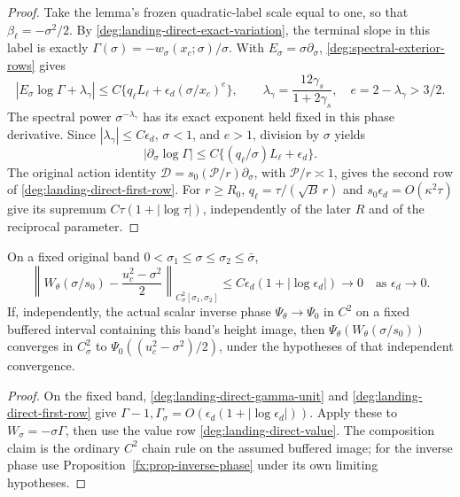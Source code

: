 \begin{proof}
Take the lemma's frozen quadratic-label scale equal to one, so that
\(\beta_\ell=-\sigma^2/2\). By
\eqref{deg:landing-direct-exact-variation}, the terminal slope in this
label is exactly \(\Gamma(\sigma)=-w_\sigma(x_c;\sigma)/\sigma\).
With \(E_\sigma=\sigma\partial_\sigma\),
\eqref{deg:spectral-exterior-rows} gives
\[
 \left|E_\sigma\log\Gamma+\lambda_\gamma\right|
 \le C\{q_\ell L_\ell+\epsilon_d(\sigma/x_c)^e\},\qquad
 \lambda_\gamma=\frac{12\gamma_s}{1+2\gamma_s},\quad
 e=2-\lambda_\gamma>3/2 .
\]
The spectral power \(\sigma^{-\lambda_\gamma}\) has its exact exponent
held fixed in this phase derivative. Since
\(|\lambda_\gamma|\le C\epsilon_d\), \(\sigma<1\), and \(e>1\),
division by \(\sigma\) yields
\[
 |\partial_\sigma\log\Gamma|
 \le C\{(q_\ell/\sigma)L_\ell+\epsilon_d\}.
\]
The original action identity
\(\mathcal D=s_0(\mathcal P/r)\partial_\sigma\), with
\(\mathcal P/r\asymp1\), gives the second row of
\eqref{deg:landing-direct-first-row}. For \(r\ge R_0\),
\(q_\ell=\tau/(\sqrt B\,r)\) and \(s_0\epsilon_d=O(\kappa^2\tau)\)
give its supremum \(C\tau(1+|\log\tau|)\), independently of the later
\(R\) and of the reciprocal parameter.
\end{proof}

\begin{corollary}\label{deg:cor-growing-landing-fixed-product}
On a fixed original band \(0<\sigma_1\le\sigma\le\sigma_2\le\bar\sigma\),
\begin{equation}\label{deg:landing-direct-fixed-product}
 \left\|W_\theta(\sigma/s_0)-\frac{u_c^2-\sigma^2}{2}\right\|_
                  {C^2_\sigma[\sigma_1,\sigma_2]}
 \le C\epsilon_d(1+|\log\epsilon_d|)\longrightarrow0
 \quad\text{as }\epsilon_d\to0 .
\end{equation}
If, independently, the actual scalar inverse phase
\(\Psi_\theta\to\Psi_0\) in \(C^2\) on a fixed buffered interval
containing this band's height image, then
\(\Psi_\theta(W_\theta(\sigma/s_0))\) converges in \(C^2_\sigma\)
to \(\Psi_0((u_c^2-\sigma^2)/2)\), under the hypotheses of that
independent convergence.
\end{corollary}
\begin{proof}
On the fixed band, \eqref{deg:landing-direct-gamma-unit} and
\eqref{deg:landing-direct-first-row} give
\(\Gamma-1,\Gamma_\sigma=O(\epsilon_d(1+|\log\epsilon_d|))\).
Apply these to \(W_\sigma=-\sigma\Gamma\), then use the value
row \eqref{deg:landing-direct-value}. The composition claim is the
ordinary \(C^2\) chain rule on the assumed buffered image; for the
inverse phase use Proposition~\ref{fx:prop-inverse-phase} under its
own limiting hypotheses.
\end{proof}

